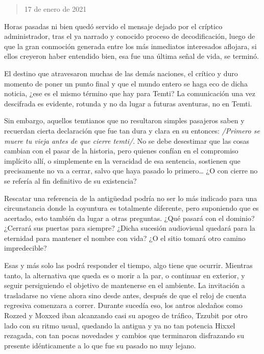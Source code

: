 \documentclass[
]{book}
\begin{document}
\begin{quote}
17 de enero de 2021
\end{quote}

Horas pasadas ni bien quedó servido el mensaje dejado por el críptico administrador, tras el ya narrado y conocido proceso de decodificación, luego de que la gran conmoción generada entre los más inmediatos interesados aflojara, si ellos creyeron haber entendido bien, esa fue una última señal de vida, se terminó.

El destino que atravesaron muchas de las demás naciones, el crítico y duro momento de poner un punto final y que el mundo entero se haga eco de dicha noticia, ¿ese es el mismo término que hay para Temti? La comunicación una vez descifrada es evidente, rotunda y no da lugar a futuras aventuras, no en Temti.

Sin embargo, aquellos temtianos que no resultaron simples pasajeros saben y recuerdan cierta declaración que fue tan dura y clara en su entonces: \emph{/Primero se muere tu vieja antes de que cierre temti/}. No se debe desestimar que las cosas cambian con el pasar de la historia, pero quienes confían en el compromiso implícito allí, o simplemente en la veracidad de esa sentencia, sostienen que precisamente no va a cerrar, salvo que haya pasado lo primero\ldots{} ¿O con cierre no se refería al fin definitivo de su existencia?

Rescatar una referencia de la antigüedad podría no ser lo más indicado para una circunstancia donde la coyuntura es totalmente diferente, pero suponiendo que es acertado, esto también da lugar a otras preguntas. ¿Qué pasará con el dominio? ¿Cerrará sus puertas para siempre? ¿Dicha sucesión audiovisual quedará para la eternidad para mantener el nombre con vida? ¿O el sitio tomará otro camino impredecible?

Esas y más solo las podrá responder el tiempo, algo tiene que ocurrir. Mientras tanto, la alternativa que queda es o morir a la par, o continuar en exterior, y seguir persiguiendo el objetivo de mantenerse en el ambiente. La invitación a trasladarse no viene ahora sino desde antes, después de que el reloj de cuenta regresiva comenzara a correr. Durante sucedía eso, los antros aledaños como Rozzed y Moxxed iban alcanzando casi su apogeo de tráfico, Tzzubit por otro lado con su ritmo usual, quedando la antigua y ya no tan potencia Hixxel rezagada, con tan pocas novedades y cambios que terminaron disfrazando su presente idénticamente a lo que fue su pasado no muy lejano.
\end{document}
